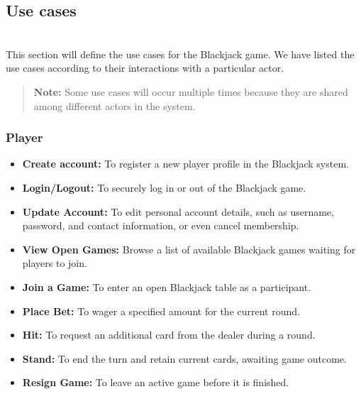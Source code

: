 \subsection{Use cases}\label{bhS0oT5A37lHzjUgQ7tbU}
\\
This section will define the use cases for the Blackjack game. We have listed the use cases according to their interactions with a particular actor.
\begin{quote}
\textbf{Note:} Some use cases will occur multiple times because they are shared among different actors in the system.
\end{quote}
\subsubsection{Player}\label{ns2oMYLLRRM_8ZiVCnlKs}

\begin{itemize}
\item
\protect{}\label{bOuaa0UfFh2UNxnM4MCTW}
\textbf{Create account:} To register a new player profile in the Blackjack system.
\item
\protect{}\label{NYTQnsp1mP_ZvNRAgryMi}
\textbf{Login/Logout:} To securely log in or out of the Blackjack game.
\item
\protect{}\label{342S2KOa70ATJ0K2X_PWE}
\textbf{Update Account:} To edit personal account details, such as username, password, and contact information, or even cancel membership.
\item
\protect{}\label{V-P9duRbX75CVAYXOY-SD}
\textbf{View Open Games:} Browse a list of available Blackjack games waiting for players to join.
\item
\protect{}\label{M6gxXSGiiwCOhqRhFsj83}
\textbf{Join a Game:} To enter an open Blackjack table as a participant.
\item
\protect{}\label{QnfoaWwoFYsMepdwPJTNs}
\textbf{Place Bet:} To wager a specified amount for the current round.
\item
\protect{}\label{g113dX1esz76EmzWZiSo9}
\textbf{Hit:} To request an additional card from the dealer during a round.
\item
\protect{}\label{82Jeyq4oaktanQOCCT8hf}
\textbf{Stand:} To end the turn and retain current cards, awaiting game outcome.
\item
\protect{}\label{EGc_S2dUs8Iub9r9pGiD-}
\textbf{Resign Game:} To leave an active game before it is finished.
\end{itemize}

